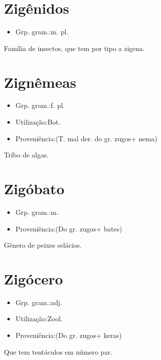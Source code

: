 \section{Zigênidos}
\begin{itemize}
\item {Grp. gram.:m. pl.}
\end{itemize}
Família de insectos, que tem por tipo a zigena.
\section{Zignêmeas}
\begin{itemize}
\item {Grp. gram.:f. pl.}
\end{itemize}
\begin{itemize}
\item {Utilização:Bot.}
\end{itemize}
\begin{itemize}
\item {Proveniência:(T. mal der. do gr. \textunderscore zugos\textunderscore  + \textunderscore nema\textunderscore )}
\end{itemize}
Tríbo de algas.
\section{Zigóbato}
\begin{itemize}
\item {Grp. gram.:m.}
\end{itemize}
\begin{itemize}
\item {Proveniência:(Do gr. \textunderscore zugos\textunderscore  + \textunderscore bates\textunderscore )}
\end{itemize}
Gênero de peixes selácios.
\section{Zigócero}
\begin{itemize}
\item {Grp. gram.:adj.}
\end{itemize}
\begin{itemize}
\item {Utilização:Zool.}
\end{itemize}
\begin{itemize}
\item {Proveniência:(Do gr. \textunderscore zugos\textunderscore  + \textunderscore keras\textunderscore )}
\end{itemize}
Que tem tentáculos em número par.
